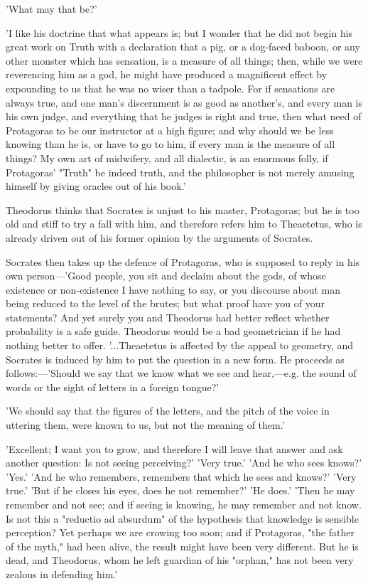 \documentclass[11pt,letter]{article}
\begin{document}
\par  'What may that be?'

\par  'I like his doctrine that what appears is; but I wonder that he did not begin his great work on Truth with a declaration that a pig, or a dog-faced baboon, or any other monster which has sensation, is a measure of all things; then, while we were reverencing him as a god, he might have produced a magnificent effect by expounding to us that he was no wiser than a tadpole. For if sensations are always true, and one man's discernment is as good as another's, and every man is his own judge, and everything that he judges is right and true, then what need of Protagoras to be our instructor at a high figure; and why should we be less knowing than he is, or have to go to him, if every man is the measure of all things? My own art of midwifery, and all dialectic, is an enormous folly, if Protagoras' "Truth" be indeed truth, and the philosopher is not merely amusing himself by giving oracles out of his book.'

\par  Theodorus thinks that Socrates is unjust to his master, Protagoras; but he is too old and stiff to try a fall with him, and therefore refers him to Theaetetus, who is already driven out of his former opinion by the arguments of Socrates.

\par  Socrates then takes up the defence of Protagoras, who is supposed to reply in his own person—'Good people, you sit and declaim about the gods, of whose existence or non-existence I have nothing to say, or you discourse about man being reduced to the level of the brutes; but what proof have you of your statements? And yet surely you and Theodorus had better reflect whether probability is a safe guide. Theodorus would be a bad geometrician if he had nothing better to offer. '...Theaetetus is affected by the appeal to geometry, and Socrates is induced by him to put the question in a new form. He proceeds as follows:—'Should we say that we know what we see and hear,—e.g. the sound of words or the sight of letters in a foreign tongue?'

\par  'We should say that the figures of the letters, and the pitch of the voice in uttering them, were known to us, but not the meaning of them.'

\par  'Excellent; I want you to grow, and therefore I will leave that answer and ask another question: Is not seeing perceiving?' 'Very true.' 'And he who sees knows?' 'Yes.' 'And he who remembers, remembers that which he sees and knows?' 'Very true.' 'But if he closes his eyes, does he not remember?' 'He does.' 'Then he may remember and not see; and if seeing is knowing, he may remember and not know. Is not this a "reductio ad absurdum" of the hypothesis that knowledge is sensible perception? Yet perhaps we are crowing too soon; and if Protagoras, "the father of the myth," had been alive, the result might have been very different. But he is dead, and Theodorus, whom he left guardian of his "orphan," has not been very zealous in defending him.'
\end{document}
